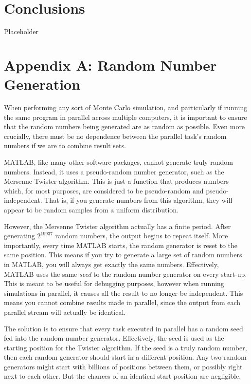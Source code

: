 \documentclass[11pt]{article}
\numberwithin{equation}{subsection}
\begin{document}
\section{Conclusions}
Placeholder

{}
\section*{Appendix A: Random Number Generation}
When performing any sort of Monte Carlo simulation, and particularly if running the same program in parallel across multiple computers, it is important to ensure that the random numbers being generated are as random as possible. Even more crucially, there must be no dependence between the parallel task's random numbers if we are to combine result sets.

MATLAB, like many other software packages, cannot generate truly random numbers. Instead, it uses a pseudo-random number generator, such as the Mersenne Twister algorithm. This is just a function that produces numbers which, for most purposes, are considered to be pseudo-random and pseudo-independent. That is, if you generate numbers from this algorithm, they will appear to be random samples from a uniform distribution. 

However, the Mersenne Twister algorithm actually has a finite period. After generating $2^{19937}$ random numbers, the output begins to repeat itself. More importantly, every time MATLAB starts, the random generator is reset to the same position. This means if you try to generate a large set of random numbers in MATLAB, you will always get exactly the same numbers. Effectively, MATLAB uses the same \textit{seed} to the random number generator on every start-up. This is meant to be useful for debugging purposes, however when running simulations in parallel, it causes all the result to no longer be independent. This means you cannot combine results made in parallel, since the output from each parallel stream will actually be identical.

The solution is to ensure that every task executed in parallel has a random seed fed into the random number generator. Effectively, the seed is used as the starting position for the Twister algorithm. If the seed is a truly random number, then each random generator should start in a different position. Any two random generators might start with billions of positions between them, or possibly right next to each other. But the chances of an identical start position are negligible.
\end{document}
